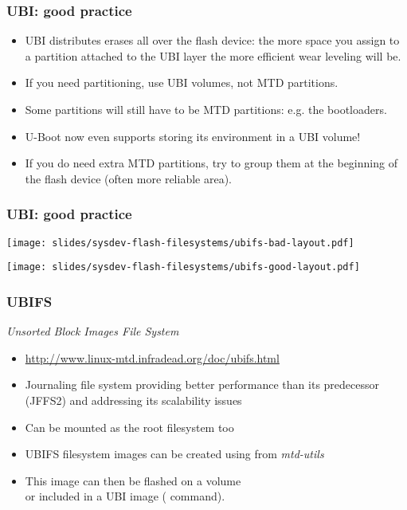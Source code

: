 \begin{frame}
  \frametitle{UBI: good practice}
  \begin{itemize}
  \item UBI distributes erases all over the flash device: the more space
    you assign to a partition attached to the UBI layer the more efficient
    wear leveling will be.
  \item If you need partitioning, use UBI volumes, not MTD partitions.
  \item Some partitions will still have to be MTD partitions: e.g. the
    bootloaders.
  \item U-Boot now even supports storing its environment in a UBI volume!
  \item If you do need extra MTD partitions, try to group them at the
    beginning of the flash device (often more reliable area).
  \end{itemize}
\end{frame}

\begin{frame}
  \frametitle{UBI: good practice}
  \begin{center}
    \texttt{[image: slides/sysdev-flash-filesystems/ubifs-bad-layout.pdf]}
  \end{center}

  \begin{center}
    \texttt{[image: slides/sysdev-flash-filesystems/ubifs-good-layout.pdf]}
  \end{center}
\end{frame}

\begin{frame}
  \frametitle{UBIFS}
  {\em Unsorted Block Images File System}
  \begin{itemize}
  \item \url{http://www.linux-mtd.infradead.org/doc/ubifs.html}
  \item Journaling file system providing better performance than
        its predecessor (JFFS2) and addressing its scalability issues
  \item Can be mounted as the root filesystem too
  \item UBIFS filesystem images can be created using 
        from {\em mtd-utils}
  \item This image can then be flashed on a volume\\
        or included in a UBI image ( command).
  \end{itemize}
\end{frame}

